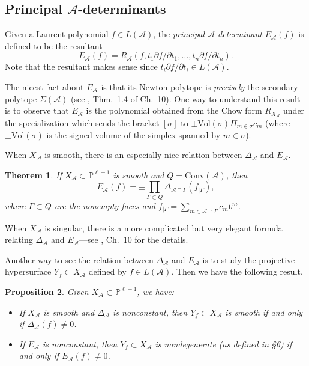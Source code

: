 \documentclass{amsart}
\theoremstyle{plain}
\newtheorem{theorem}{Theorem}[section]
\newtheorem{proposition}[theorem]{Proposition}
\theoremstyle{definition}
\begin{document}
	\subsection{Principal \texorpdfstring{$\mathcal{A}$}{A}-determinants} Given a
Laurent polynomial $f
\in L(\mathcal{A})$, the {\it principal $\mathcal{A}$-determinant\/}
$E_{\mathcal{A}}(f)$ is defined to be the resultant
\[
E_{\mathcal{A}}(f) = R_{\mathcal{A}}(f,t_1\partial f/\partial t_1,\dots,
t_n\partial f/\partial t_n).
\]
Note that the resultant makes sense since $t_i\partial f/\partial t_i
\in L(\mathcal{A})$.

	The nicest fact about $E_{\mathcal{A}}$ is that its Newton
polytope is {\it precisely\/} the secondary polytope $\Sigma(\mathcal{A})$
(see \cite{GKZ1}, Thm.~1.4 of Ch.~10).  One way to understand this
result is to observe that $E_{\mathcal{A}}$ is the polynomial obtained
from the Chow form $R_{X_{\mathcal{A}}}$ under the specialization which
sends the bracket $[\sigma]$ to $\pm\mathrm{Vol}(\sigma)
\Pi_{m\in\sigma} c_m$ (where $\pm\mathrm{Vol}(\sigma)$ is the signed
volume of the simplex spanned by $m \in \sigma$).

	When $X_{\mathcal{A}}$ is smooth, there is an especially nice
relation between $\Delta_{\mathcal{A}}$ and $E_{\mathcal{A}}$.

\begin{theorem} If $X_{\mathcal{A}} \subset \mathbb{P}^{\ell-1}$ is
smooth and $Q = \mathrm{Conv}(\mathcal{A})$, then  
\[
E_{\mathcal{A}}(f) = \pm{\textstyle{\prod_{\Gamma \subset Q}}}
\Delta_{\mathcal{A}\cap\Gamma}(f_{|\Gamma}), 
\]
where $\Gamma \subset Q$ are the nonempty faces and
$f_{|\Gamma} = \sum_{m\in\mathcal{A}\cap\Gamma} c_m \mathbf{t}^m$.
\end{theorem}

	When $X_{\mathcal{A}}$ is singular, there is a more complicated
but very elegant formula relating $\Delta_{\mathcal{A}}$ and
$E_{\mathcal{A}}$---see \cite{GKZ1}, Ch.~10 for the details.

	Another way to see the relation between $\Delta_{\mathcal{A}}$ and
$E_{\mathcal{A}}$ is to study the projective hypersurface $Y_f \subset
X_{\mathcal{A}}$ defined by $f \in L(\mathcal{A})$.  Then we have the
following result.

\begin{proposition} Given $X_{\mathcal{A}} \subset \mathbb{P}^{\ell-1}$, we have:
\begin{itemize}
\item If $X_{\mathcal{A}}$ is smooth and $\Delta_{\mathcal{A}}$ is
nonconstant, then $Y_f \subset X_{\mathcal{A}}$ is smooth if and only if
$\Delta_{\mathcal{A}}(f) \ne 0$.
\item If $E_{\mathcal{A}}$ is nonconstant, then $Y_f \subset
X_{\mathcal{A}}$ is nondegenerate (as defined in \S6) if and only if
$E_{\mathcal{A}}(f) \ne 0$.
\end{itemize}
\end{proposition}
\end{document}
